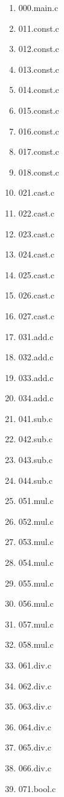\begin{multicols}{4}
    \begin{enumerate}
        \item 000.main.c
        \item 011.const.c
        \item 012.const.c
        \item 013.const.c
        \item 014.const.c
        \item 015.const.c
        \item 016.const.c
        \item 017.const.c
        \item 018.const.c
        \item 021.cast.c
        \item 022.cast.c
        \item 023.cast.c
        \item 024.cast.c
        \item 025.cast.c
        \item 026.cast.c
        \item 027.cast.c
        \item 031.add.c
        \item 032.add.c
        \item 033.add.c
        \item 034.add.c
        \item 041.sub.c
        \item 042.sub.c
        \item 043.sub.c
        \item 044.sub.c
        \item 051.mul.c
        \item 052.mul.c
        \item 053.mul.c
        \item 054.mul.c
        \item 055.mul.c
        \item 056.mul.c
        \item 057.mul.c
        \item 058.mul.c
        \item 061.div.c
        \item 062.div.c
        \item 063.div.c
        \item 064.div.c
        \item 065.div.c
        \item 066.div.c
        \item 071.bool.c

\end{enumerate}
\end{multicols}
